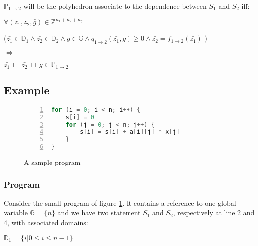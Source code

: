 $\mathbb{P}_{1 \rightarrow 2}$ will be the polyhedron associate to the dependence between $S_{1}$ and $S_{2}$ iff:
%
%
%
\begin{center}
$\forall (\bar{z_{1}}, \bar{z_{2}}, \bar{g}) \in \mathbb{Z}^{n_{1} + n_{2} + n_{g}}$

($\bar{z_{1}} \in \mathbb{D}_{1} \wedge \bar{z_{2}} \in \mathbb{D}_{2} \wedge \bar{g} \in \mathbb{G} \wedge q_{1 \rightarrow 2}(\bar{z_{1}}, \bar{g}) \geq 0 \wedge \bar{z_{2}} = f_{1 \rightarrow 2}(\bar{z_{1}})$ )

$\Leftrightarrow$

$ \bar{z_{1}} \,\Box\, \bar{z_{2}} \,\Box\, \bar{g} \in \mathbb{P}_{1 \rightarrow 2}$
\end{center}

		\subsection{Example}
		\label{polyhedric:maths:example}

\begin{figure}[!h]	
\begin{lstlisting}[language=C, numbers=left]
for (i = 0; i < n; i++) {
    s[i] = 0
    for (j = 0; j < n; j++) {
        s[i] = s[i] + a[i][j] * x[j]
    }
}
\end{lstlisting}
\caption{A sample program}
\label{polyhedric:sampleprogram}
\end{figure}

			\subsubsection{Program}

Consider the small program of figure \ref{polyhedric:sampleprogram}. It contains a reference to one global variable
$\mathbb{G} = \{ n \}$ and we have two statement $S_{1}$ and $S_{2}$, respectively at line 2 and 4, with associated domains:

$\mathbb{D}_{1} = \{ i | 0 \leq i \leq n - 1 \}$ 

